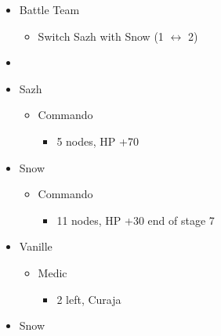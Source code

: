 \begin{menu}
\begin{itemize}
    \paradigm
    \begin{itemize}
        \item Battle Team
        \begin{itemize}
            \item Switch Sazh with Snow (1 $\leftrightarrow$ 2)
        \end{itemize}
        \item {}%
{\paradigmline{(\rav)}{\com}{\com}}%
{\paradigmline[2]{\textit{\com}}{\textit{\com}}{\textit{\com}}}%
{\paradigmline{(\rav)}{\sen}{(\rav)}}%
{\paradigmline{(\com)}{(\sen)}{\med}}%
{\paradigmline{\rav}{(\com)}{(\rav)}}%
{\paradigmline{\rav}{\rav}{\rav}}
    \end{itemize}
    \crystarium
    \begin{itemize}
        \item Sazh
        \begin{itemize}
            \item Commando
            \begin{itemize}
                \item 5 nodes, HP +70
            \end{itemize}
        \end{itemize}
        \item Snow
        \begin{itemize}
            \item Commando
            \begin{itemize}
                \item 11 nodes, HP +30 end of stage 7
            \end{itemize}
        \end{itemize}
        \item Vanille
        \begin{itemize}
            \item Medic
            \begin{itemize}
                \item 2 left, Curaja
            \end{itemize}
        \end{itemize}
    \end{itemize}
    \equip
    \begin{itemize}
        \item Snow
        \begin{itemize}

\end{itemize}
\end{itemize}
\end{itemize}
\end{menu}
